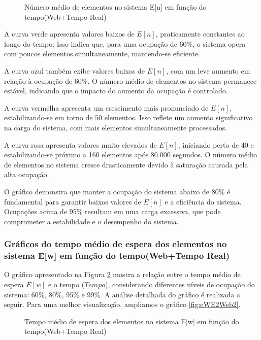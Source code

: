 \begin{figure}[h!]
   \centering
   
   \caption{Número médio de elementos no sistema E[n] em função do tempo(Web+Tempo Real)}
   \label{fig:eNE2Web}
\end{figure}

A curva verde apresenta valores baixos de $E[n]$, praticamente constantes ao longo do tempo. Isso indica que, para uma ocupação de 60\%, o sistema opera com poucos elementos simultaneamente, mantendo-se eficiente.

A curva azul também exibe valores baixos de $E[n]$, com um leve aumento em relação à ocupação de 60\%. O número médio de elementos no sistema permanece estável, indicando que o impacto do aumento da ocupação é controlado.

A curva vermelha apresenta um crescimento mais pronunciado de $E[n]$, estabilizando-se em torno de 50 elementos. Isso reflete um aumento significativo na carga do sistema, com mais elementos simultaneamente processados.

A curva rosa apresenta valores muito elevados de $E[n]$, iniciando perto de 40 e estabilizando-se próximo a 160 elementos após 80.000 segundos. O número médio de elementos no sistema cresce drasticamente devido à saturação causada pela alta ocupação.

O gráfico demonstra que manter a ocupação do sistema abaixo de 80\% é fundamental para garantir baixos valores de $E[n]$ e a eficiência do sistema. Ocupações acima de 95\% resultam em uma carga excessiva, que pode comprometer a estabilidade e o desempenho do sistema.


\subsubsection{Gráficos do tempo médio de espera dos elementos no sistema E[w] em função do tempo(Web+Tempo Real)}
O gráfico apresentado na Figura \ref{fig:eWE2Web} mostra a relação entre o tempo médio de espera $E[w]$ e o tempo ($Tempo$), considerando diferentes níveis de ocupação do sistema: 60\%, 80\%, 95\% e 99\%. A análise detalhada do gráfico é realizada a seguir. Para uma melhor visualização, ampliamos o gráfico \ref{fig:eWE2Web2}.

\begin{figure}[h!]
   \centering
   
   \caption{Tempo médio de espera dos elementos no sistema E[w] em função do tempo(Web+Tempo Real)}
   \label{fig:eWE2Web}
\end{figure}


